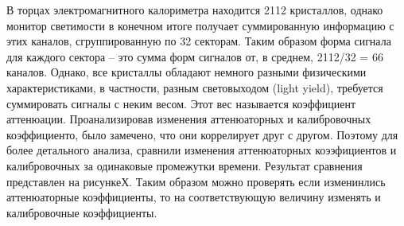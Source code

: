   В торцах электромагнитного калориметра находится 2112 кристаллов, однако монитор светимости в конечном итоге получает суммированную информацию с этих каналов, сгруппированную по 32 секторам. Таким образом форма сигнала для каждого сектора -- это сумма форм сигналов от, в среднем, 2112/32 = 66 каналов. Однако, все кристаллы обладают немного разными физическими характеристиками, в частности, разным световыходом (light yield), требуется суммировать сигналы с неким весом. Этот вес называется коэффициент аттенюации. Проанализировав изменения аттенюаторных и калибровочных коэффициенто, было замечено, что они коррелирует друг с другом. Поэтому для более детального анализа, сравнили изменения аттенюаторных коээфициентов и калибровочных за одинаковые промежутки времени. Результат сравнения представлен на рисункеХ. Таким образом можно проверять если изменинлись аттенюаторные коэффициенты, то на соответствующую величину изменять и калибровочные коэффициенты.
